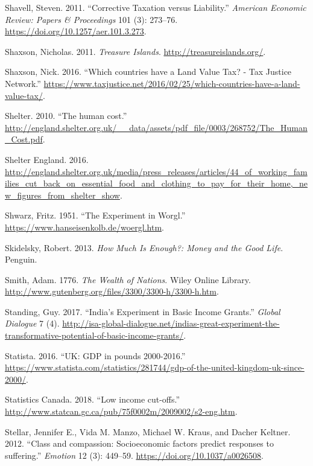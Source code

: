 \documentclass[]{tufte-handout}
\begin{document}
\leavevmode\hypertarget{ref-Shavell2011}{}%
Shavell, Steven. 2011. ``Corrective Taxation versus Liability.''
\emph{American Economic Review: Papers \& Proceedings} 101 (3): 273--76.
\url{https://doi.org/10.1257/aer.101.3.273}.

\leavevmode\hypertarget{ref-Shaxson2011}{}%
Shaxson, Nicholas. 2011. \emph{Treasure Islands}.
\url{http://treasureislands.org/}.

\leavevmode\hypertarget{ref-Shaxson2016}{}%
Shaxson, Nick. 2016. ``Which countries have a Land Value Tax? - Tax
Justice Network.''
\url{https://www.taxjustice.net/2016/02/25/which-countries-have-a-land-value-tax/}.

\leavevmode\hypertarget{ref-Shelter2010}{}%
Shelter. 2010. ``The human cost.''
\url{http://england.shelter.org.uk/__data/assets/pdf_file/0003/268752/The_Human_Cost.pdf}.

\leavevmode\hypertarget{ref-ShelterEngland2016}{}%
Shelter England. 2016.
\url{http://england.shelter.org.uk/media/press_releases/articles/44_of_working_families_cut_back_on_essential_food_and_clothing_to_pay_for_their_home,_new_figures_from_shelter_show}.

\leavevmode\hypertarget{ref-Shwarz1951}{}%
Shwarz, Fritz. 1951. ``The Experiment in Worgl.''
\url{https://www.hanseisenkolb.de/woergl.htm}.

\leavevmode\hypertarget{ref-Skidelsky2013}{}%
Skidelsky, Robert. 2013. \emph{How Much Is Enough?: Money and the Good
Life}. Penguin.

\leavevmode\hypertarget{ref-smith1776wealth}{}%
Smith, Adam. 1776. \emph{The Wealth of Nations}. Wiley Online Library.
\url{http://www.gutenberg.org/files/3300/3300-h/3300-h.htm}.

\leavevmode\hypertarget{ref-Standing2017}{}%
Standing, Guy. 2017. ``India's Experiment in Basic Income Grants.''
\emph{Global Dialogue} 7 (4).
\url{http://isa-global-dialogue.net/indias-great-experiment-the-transformative-potential-of-basic-income-grants/}.

\leavevmode\hypertarget{ref-Statista2016}{}%
Statista. 2016. ``UK: GDP in pounds 2000-2016.''
\url{https://www.statista.com/statistics/281744/gdp-of-the-united-kingdom-uk-since-2000/}.

\leavevmode\hypertarget{ref-StatisticsCanada2018}{}%
Statistics Canada. 2018. ``Low income cut-offs.''
\url{http://www.statcan.gc.ca/pub/75f0002m/2009002/s2-eng.htm}.

\leavevmode\hypertarget{ref-Stellar2012}{}%
Stellar, Jennifer E., Vida M. Manzo, Michael W. Kraus, and Dacher
Keltner. 2012. ``Class and compassion: Socioeconomic factors predict
responses to suffering.'' \emph{Emotion} 12 (3): 449--59.
\url{https://doi.org/10.1037/a0026508}.
\end{document}
